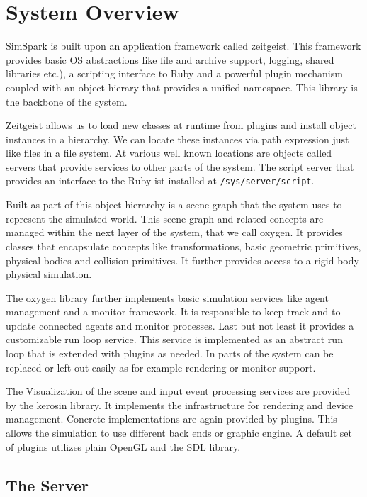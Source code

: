  \chapter{System Overview}


SimSpark is built upon an application framework called zeitgeist. This
framework provides basic OS abstractions like file and archive
support, logging, shared libraries etc.), a scripting interface to
Ruby and a powerful plugin mechanism coupled with an object hierary
that provides a unified namespace. This library is the backbone of the
system.

Zeitgeist allows us to load new classes at runtime from plugins and
install object instances in a hierarchy. We can locate these instances
via path expression just like files in a file system. At various well
known locations are objects called servers that provide services to
other parts of the system. The script server that provides an
interface to the Ruby ist installed at \texttt{/sys/server/script}.

Built as part of this object hierarchy is a scene graph that the
system uses to represent the simulated world. This scene graph and
related concepts are managed within the next layer of the system, that
we call oxygen. It provides classes that encapsulate concepts like
transformations, basic geometric primitives, physical bodies and
collision primitives. It further provides access to a rigid body
physical simulation.

The oxygen library further implements basic simulation services like
agent management and a monitor framework. It is responsible to keep
track and to update connected agents and monitor processes. Last but
not least it provides a customizable run loop service. This service is
implemented as an abstract run loop that is extended with plugins as
needed. In parts of the system can be replaced or left out easily as
for example rendering or monitor support.

The Visualization of the scene and input event processing services are
provided by the kerosin library. It implements the infrastructure for
rendering and device management. Concrete implementations are again
provided by plugins. This allows the simulation to use different back
ends or graphic engine. A default set of plugins utilizes plain OpenGL
and the SDL library.

\section{The Server}

